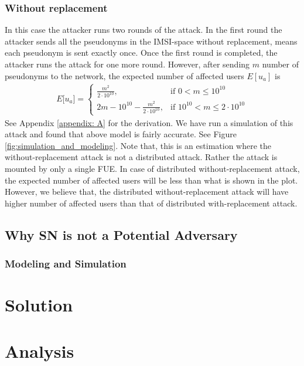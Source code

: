 \documentclass{llncs} %
\begin{document}
\subsubsection{Without replacement}
In this case the attacker runs two rounds of the attack. In the first round the attacker sends all the pseudonyms in the IMSI-space without replacement, means each pseudonym is sent exactly once. Once the first round is completed, the attacker runs the attack for one more round. However, after sending $m$ number of pseudonyms to the network, the expected number of affected users $E[u_a]$ is
\begin{eqnarray}
E\big[ u_a \big] = \begin{cases} \frac{m^2}{2\cdot 10^{10}}, & \mbox{if } 0 < m \leq 10^{10} \\ 
2m - 10^{10} - \frac{m^2}{2\cdot 10^{10}}, & \mbox{if } 10^{10} < m \leq 2\cdot 10^{10} \end{cases}
\end{eqnarray} 
See Appendix \ref{appendix: A} for the derivation. We have run a simulation of this attack and found that above model is fairly accurate. See Figure \ref{fig:simulation_and_modeling}. Note that, this is an estimation where the without-replacement attack is not a distributed attack. Rather the attack is mounted by only a single FUE. In case of distributed without-replacement attack, the expected number of affected users will be less than what is shown in the plot. However, we believe that, the distributed without-replacement attack will have higher number of affected users than that of distributed with-replacement attack.



\subsection{Why SN is not a Potential Adversary}


\subsubsection{Modeling and Simulation}


\section{Solution}

\section{Analysis}
\end{document}
